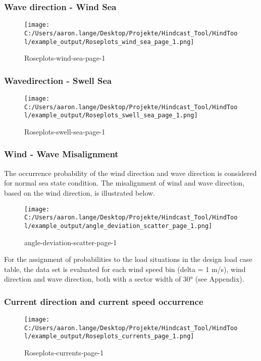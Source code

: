 \subsubsection{Wave direction - Wind Sea}

\begin{figure}[H] 
 \centering 
 \texttt{[image: C:/Users/aaron.lange/Desktop/Projekte/Hindcast\_Tool/HindTool/example\_output/Roseplots\_wind\_sea\_page\_1.png]} 
 \caption{ Roseplots-wind-sea-page-1 } 
 \label{fig: Roseplots_wind_sea_page_1 } 
\end{figure}

\subsubsection{Wavedirection - Swell Sea}

\begin{figure}[H] 
 \centering 
 \texttt{[image: C:/Users/aaron.lange/Desktop/Projekte/Hindcast\_Tool/HindTool/example\_output/Roseplots\_swell\_sea\_page\_1.png]} 
 \caption{ Roseplots-swell-sea-page-1 } 
 \label{fig: Roseplots_swell_sea_page_1 } 
\end{figure}

\subsubsection{Wind - Wave Misalignment}

The occurrence probability of the wind direction and wave direction is considered for normal sea state condition. The misalignment of wind and wave direction, based on the wind direction, is illustrated below. 

\begin{figure}[H] 
 \centering 
 \texttt{[image: C:/Users/aaron.lange/Desktop/Projekte/Hindcast\_Tool/HindTool/example\_output/angle\_deviation\_scatter\_page\_1.png]} 
 \caption{ angle-deviation-scatter-page-1 } 
 \label{fig: angle_deviation_scatter_page_1 } 
\end{figure}

For the assignment of probabilities to the load situations in the design load case table, the data set is evaluated for each wind speed bin (delta = 1 m/s), wind direction and wave direction, both with a sector width of 30° (see Appendix). 


\clearpage
\subsubsection{Current direction and current speed occurrence}

\begin{figure}[H] 
 \centering 
 \texttt{[image: C:/Users/aaron.lange/Desktop/Projekte/Hindcast\_Tool/HindTool/example\_output/Roseplots\_currents\_page\_1.png]} 
 \caption{ Roseplots-currents-page-1 } 
 \label{fig: Roseplots_currents_page_1 } 
\end{figure}